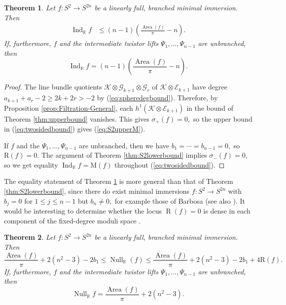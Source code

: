 \documentclass[11pt]{article}
\newtheorem{theorem}{Theorem}[section]
\theoremstyle{definition}
\newcommand{\R}{\mathbb{R}}
\numberwithin{equation}{section}
\begin{document}
\begin{theorem} \label{thm:S2upperbound}
	Let $f: S^2 \to S^{2n}$ be a linearly full, branched minimal immersion. Then
	\begin{equation}\label{eq:S2upperM}
		\begin{aligned}
			\operatorname{Ind}_\R f & \leq ({n-1}) \left(\frac{\operatorname{Area}(f)}{\pi} - n \right). 
		\end{aligned}
	\end{equation}
    If, furthermore, $f$ and the intermediate twistor lifts $\Psi_1, \ldots, \Psi_{n-1}$ are unbranched, then
    \begin{equation*}
        \operatorname{Ind}_\R f = (n-1)\left(\frac{\operatorname{Area}(f)}{\pi} - n\right).
    \end{equation*}
\end{theorem} 

\begin{proof}
	The line bundle quotients $\mathcal{K} \otimes \mathcal{G}_{k+1} \otimes \mathcal{G}_r$ of $\mathcal{K} \otimes \mathcal{E}_{k+1}$ have degree $a_{k+1}+a_r-2 \geq 2k + 2r > -2$ by (\ref{eq:spheredegbound}). Therefore, by Proposition \ref{prop:Filtration-General}, each $h^1(\mathcal{K} \otimes \mathcal{E}_{k+1})$ in the bound of Theorem \ref{thm:upperbound} vanishes. This gives $\sigma_+(f) = 0,$ so the upper bound in (\ref{eq:twosidedbound}) gives (\ref{eq:S2upperM}).

    If $f$ and the $\Psi_1, \ldots, \Psi_{n-1}$ are unbranched, then we have $b_1 = \cdots = b_{n-1} = 0,$ so $\mathrm{R}(f) = 0.$ The argument of Theorem \ref{thm:S2lowerbound} implies $\sigma_-(f) = 0,$ so we get equality $\operatorname{Ind}_\R f = \mathrm{M}(f)$ throughout (\ref{eq:twosidedbound}).
\end{proof}

The equality statement of Theorem \ref{thm:S2upperbound} is more general than that of Theorem \ref{thm:S2lowerbound}, since there do exist minimal immersions $f: S^2 \to S^{2n}$ with $b_j = 0$ for $1 \leq j \leq n-1$ but $b_n \neq 0,$ for example those of Barbosa \cite[\S7]{Barbosa75} (see also \cite{Ejiri86}). It would be interesting to determine whether the locus $\operatorname{R}(f)=0$ is dense in each component of the fixed-degree moduli space \cite{Fernandez12}.

\begin{theorem}\label{thm:S2NullityTheorem}
    Let $f: S^{2} \to S^{2n}$ be a linearly full, branched minimal immersion. Then
    \begin{equation*}
        \frac{\operatorname{Area}(f)}{\pi}+2(n^2 - 3) - 2 b_1 \leq \operatorname{Null}_\R(f) \leq \frac{\operatorname{Area}(f)}{\pi}+2(n^2 - 3) - 2 b_1 + 4 \mathrm{R}(f).
    \end{equation*}
    If, furthermore, $f$ and the intermediate twistor lifts $\Psi_1, \ldots, \Psi_{n-1}$ are unbranched, then
    \begin{equation*}
        \operatorname{Null}_\R f = \frac{\operatorname{Area}(f)}{\pi}+2(n^2 - 3).
    \end{equation*}
\end{theorem}
\end{document}

